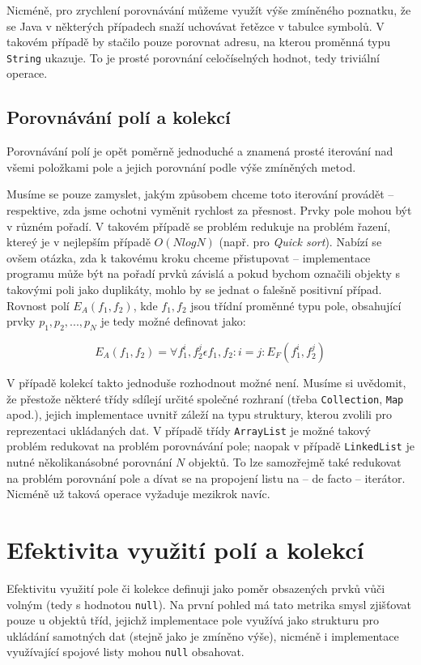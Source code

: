 Nicméně, pro zrychlení porovnávání můžeme využít výše zmíněného poznatku, že se Java v některých případech snaží uchovávat řetězce v tabulce symbolů. V takovém případě by stačilo pouze porovnat adresu, na kterou proměnná typu \texttt{String} ukazuje. To je prosté porovnání celočíselných hodnot, tedy triviální operace.

\subsection{Porovnávání polí a kolekcí}
Porovnávání polí je opět poměrně jednoduché a znamená prosté iterování nad všemi položkami pole a jejich porovnání podle výše zmíněných metod. 

Musíme se pouze zamyslet, jakým způsobem chceme toto iterování provádět -- respektive, zda jsme ochotni vyměnit rychlost za přesnost. Prvky pole mohou být v různém pořadí. V takovém případě se problém redukuje na problém řazení, ktereý je v nejlepším případě $O(N logN)$ (např. pro \textit{Quick sort}). Nabízí se ovšem otázka, zda k takovému kroku chceme přistupovat -- implementace programu může být na pořadí prvků závislá a pokud bychom označili objekty s takovými poli jako duplikáty, mohlo by se jednat o falešně positivní případ. Rovnost polí $E_A(f_1, f_2)$, kde $f_1, f_2$ jsou třídní proměnné typu pole, obsahující prvky $p_1, p_2, ..., p_N$ je tedy možné definovat jako:

\begin{equation}
E_A(f_1, f_2)=\forall f_1^i, f_2^j \epsilon f_1, f_2: i = j : E_F(f_1^i, f_2^j)
\end{equation}

V případě kolekcí takto jednoduše rozhodnout možné není. Musíme si uvědomit, že přestože některé třídy sdílejí určité společné rozhraní (třeba \texttt{Collection}, \texttt{Map} apod.), jejich implementace uvnitř záleží na typu struktury, kterou zvolili pro reprezentaci ukládaných dat. V případě třídy \texttt{ArrayList} je možné takový problém redukovat na problém porovnávání pole; naopak v případě \texttt{LinkedList} je nutné několikanásobné porovnání $N$ objektů. To lze samozřejmě také redukovat na problém porovnání pole a dívat se na propojení listu na -- de facto -- iterátor. Nicméně už taková operace vyžaduje mezikrok navíc.

\section{Efektivita využití polí a kolekcí}
Efektivitu využití pole či kolekce definuji jako poměr obsazených prvků vůči volným (tedy s hodnotou \texttt{null}). Na první pohled má tato metrika smysl zjišťovat pouze u objektů tříd, jejichž implementace pole využívá jako strukturu pro ukládání samotných dat (stejně jako je zmíněno výše), nicméně i implementace využívající spojové listy mohou \texttt{null} obsahovat.

